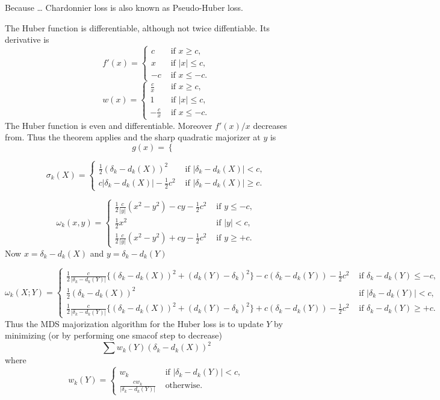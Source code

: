 \documentclass[
  12pt,
  letterpaper,
  DIV=11,
  numbers=noendperiod]{scrartcl}
\begin{document}
Because \ldots{} Chardonnier loss is also known as Pseudo-Huber loss.

The Huber function is differentiable, although not twice diffentiable.
Its derivative is \[
f'(x)=\begin{cases}
c&\text{ if }x\geq c,\\
x&\text{ if }|x|\leq c,\\
-c&\text{ if }x\leq -c.
\end{cases}
\] \[
w(x)=
\begin{cases}
\frac{c}{x}&\text{ if }x\geq c,\\
1&\text{ if }|x|\leq c,\\
-\frac{c}{x}&\text{ if }x\leq -c.
\end{cases}
\] The Huber function is even and differentiable. Moreover \(f'(x)/x\)
decreases from. Thus the theorem applies and the sharp quadratic
majorizer at \(y\) is \[
g(x)=\begin{cases}
\end{cases}
\]

\[
\sigma_k(X)=\begin{cases}
\frac12(\delta_k-d_k(X))^2&\text{ if }|\delta_k-d_k(X)|<c,\\
c|\delta_k-d_k(X)|-\frac12 c^2&\text{ if }|\delta_k-d_k(X)|\geq c.
\end{cases}
\]

\[
\omega_k(x,y)=\begin{cases}
\frac12\frac{c}{|y|}(x^2-y^2)-cy-\frac12c^2&\text{ if }y\leq -c,\\
\frac12x^2&\text{ if }|y|<c,\\
\frac12\frac{c}{|y|}(x^2-y^2)+cy-\frac12c^2&\text{ if }y\geq +c.
\end{cases}
\] Now \(x=\delta_k-d_k(X)\) and \(y=\delta_k-d_k(Y)\)

\[
\omega_k(X;Y)=\begin{cases}
\frac12\frac{c}{|\delta_k-d_k(Y)|}\{(\delta_k-d_k(X))^2+(d_k(Y)-\delta_k)^2\}-c(\delta_k-d_k(Y))-\frac12c^2&\text{ if }\delta_k-d_k(Y)\leq -c,\\
\frac12(\delta_k-d_k(X))^2&\text{ if }|\delta_k-d_k(Y)|<c,\\
\frac12\frac{c}{|\delta_k-d_k(Y)|}\{(\delta_k-d_k(X))^2+(d_k(Y)-\delta_k)^2\}+c(\delta_k-d_k(Y))-\frac12c^2&\text{ if }\delta_k-d_k(Y)\geq +c.
\end{cases}
\] Thus the MDS majorization algorithm for the Huber loss is to update
\(Y\) by minimizing (or by performing one smacof step to decrease) \[
\sum w_k(Y)(\delta_k-d_k(X))^2
\] where \[
w_k(Y)=\begin{cases}
w_k&\text{ if }|\delta_k-d_k(Y)|<c,\\
\frac{cw_k}{|\delta_k-d_k(Y)|}&\text{ otherwise}.
\end{cases}
\]
\end{document}
